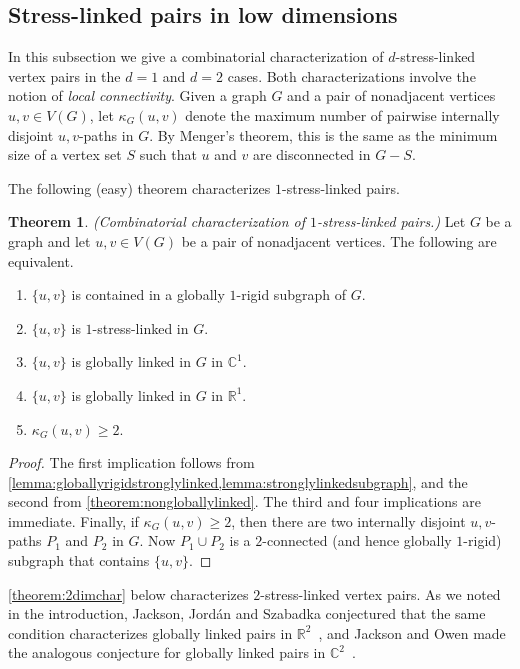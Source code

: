 \documentclass[11pt,a4paper,dvipsnames]{scrartcl}
\theoremstyle{definition}
\newtheorem{theorem}{Theorem}[section]
\newcommand{\RR}{\mathbb{R}}
\newcommand{\CC}{\mathbb{C}}
\newcommand{\globrig}[1]{globally $#1$-rigid}
\newcommand{\strongly}[1]{${#1}$-stress-linked}
\begin{document}
\subsection{Stress-linked pairs in low dimensions}

In this subsection we give a combinatorial characterization of \strongly{d} vertex pairs in the $d=1$ and $d=2$ cases. Both characterizations involve the notion of \emph{local connectivity}.
Given a graph $G$ and a pair of nonadjacent vertices $u,v \in V(G)$, let $\kappa_G(u,v)$ denote the maximum number of pairwise internally disjoint $u,v$-paths in $G$. By Menger's theorem, this is the same as the minimum size of a vertex set $S$ such that $u$ and $v$ are disconnected in $G-S$.

The following (easy) theorem characterizes \strongly{1} pairs. %

\begin{theorem}\label{theorem:1dimchar} \emph{(Combinatorial characterization of \strongly{1} pairs.)}\newline
    Let $G$ be a graph and let $u,v \in V(G)$ be a pair of nonadjacent vertices. The following are equivalent.
    \begin{enumerate}
        \item $\{u,v\}$ is contained in a \globrig{1} subgraph of $G$.
        \item $\{u,v\}$ is \strongly{1} in $G$.
        \item $\{u,v\}$ is globally linked in $G$ in $\CC^1$.
        \item $\{u,v\}$ is globally linked in $G$ in $\RR^1$.
        \item $\kappa_G(u,v) \geq 2$.
    \end{enumerate}
\end{theorem}
\begin{proof}
    The first implication follows from \cref{lemma:globallyrigidstronglylinked,lemma:stronglylinkedsubgraph}, and the second from \cref{theorem:nongloballylinked}. The third and four implications are immediate. Finally, if $\kappa_G(u,v) \geq 2$, then there are two internally disjoint $u,v$-paths $P_1$ and $P_2$ in $G$. Now $P_1 \cup P_2$ is a $2$-connected (and hence \globrig{1}) subgraph that contains $\{u,v\}$.
\end{proof}

\cref{theorem:2dimchar} below characterizes \strongly{2} vertex pairs. As we noted in the introduction, Jackson, Jordán and Szabadka conjectured that the same condition characterizes globally linked pairs in $\RR^2$~\cite[Conjecture 5.9]{jackson.etal_2006}, and Jackson and Owen made the analogous conjecture for globally linked pairs in $\CC^2$~\cite[Conjecture 5.4]{jackson.owen_2019}.
\end{document}
